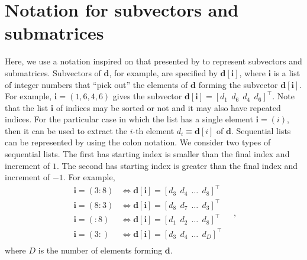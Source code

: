 \documentclass[utf8]{FrontiersinHarvard} %
\begin{document}
	\section{Notation for subvectors and submatrices}
	
	Here, we use a notation inspired on that presented by \citet[][p. 4]{vanloan1992} to represent subvectors and submatrices.
	Subvectors of $\mathbf{d}$, for example, are specified by $\mathbf{d}[\mathbf{i}]$, where $\mathbf{i}$ is a
	list of integer numbers that ``pick out'' the elements of $\mathbf{d}$ forming the subvector $\mathbf{d}[\mathbf{i}]$.
	For example, $\mathbf{i} = (1, 6, 4, 6)$ gives the subvector $\mathbf{d}[\mathbf{i}] = [ d_{1} \:\: d_{6} \:\: d_{4} \:\: d_{6} ]^{\top} $.
	Note that the list $\mathbf{i}$ of indices may be sorted or not and it may also have repeated indices.
	For the particular case in which the list has a single element $\mathbf{i} = (i)$, then it can be used to extract the $i$-th element 
	$d_{i} \equiv \mathbf{d}[i]$ of $\mathbf{d}$.
	Sequential lists can be represented by using the colon notation. We consider two types of sequential lists. The first has starting index is smaller than the final index and increment of $1$. The second has starting index is greater than the final index and increment of $-1$. For example, 
	\begin{equation*}
		\begin{split}
			\mathbf{i} = (3:8) &\Leftrightarrow \mathbf{d}[\mathbf{i}] = [ d_{3} \:\: d_{4} \:\: \dots \:\: d_{8} ]^{\top} \\
			\mathbf{i} = (8:3) &\Leftrightarrow \mathbf{d}[\mathbf{i}] = [ d_{8} \:\: d_{7} \:\: \dots \:\: d_{3} ]^{\top} \\
			\mathbf{i} = (:8) &\Leftrightarrow \mathbf{d}[\mathbf{i}] = [ d_{1} \:\: d_{2} \:\: \dots \:\: d_{8} ]^{\top} \\
			\mathbf{i} = (3:) &\Leftrightarrow \mathbf{d}[\mathbf{i}] = [ d_{3} \:\: d_{4} \:\: \dots \:\: d_{D} ]^{\top} \\
		\end{split} \quad ,
	\end{equation*}
	where $D$ is the number of elements forming $\mathbf{d}$.
	
\end{document}
